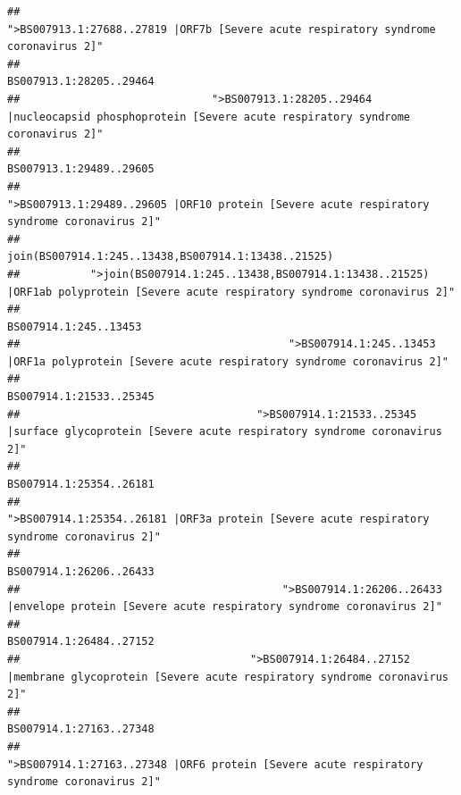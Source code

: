 \documentclass[
]{article}
\begin{document}
\begin{verbatim}
##                                                    ">BS007913.1:27688..27819 |ORF7b [Severe acute respiratory syndrome coronavirus 2]" 
##                                                                                                                BS007913.1:28205..29464 
##                              ">BS007913.1:28205..29464 |nucleocapsid phosphoprotein [Severe acute respiratory syndrome coronavirus 2]" 
##                                                                                                                BS007913.1:29489..29605 
##                                            ">BS007913.1:29489..29605 |ORF10 protein [Severe acute respiratory syndrome coronavirus 2]" 
##                                                                                    join(BS007914.1:245..13438,BS007914.1:13438..21525) 
##           ">join(BS007914.1:245..13438,BS007914.1:13438..21525) |ORF1ab polyprotein [Severe acute respiratory syndrome coronavirus 2]" 
##                                                                                                                  BS007914.1:245..13453 
##                                          ">BS007914.1:245..13453 |ORF1a polyprotein [Severe acute respiratory syndrome coronavirus 2]" 
##                                                                                                                BS007914.1:21533..25345 
##                                     ">BS007914.1:21533..25345 |surface glycoprotein [Severe acute respiratory syndrome coronavirus 2]" 
##                                                                                                                BS007914.1:25354..26181 
##                                            ">BS007914.1:25354..26181 |ORF3a protein [Severe acute respiratory syndrome coronavirus 2]" 
##                                                                                                                BS007914.1:26206..26433 
##                                         ">BS007914.1:26206..26433 |envelope protein [Severe acute respiratory syndrome coronavirus 2]" 
##                                                                                                                BS007914.1:26484..27152 
##                                    ">BS007914.1:26484..27152 |membrane glycoprotein [Severe acute respiratory syndrome coronavirus 2]" 
##                                                                                                                BS007914.1:27163..27348 
##                                             ">BS007914.1:27163..27348 |ORF6 protein [Severe acute respiratory syndrome coronavirus 2]" 

\end{verbatim}
\end{document}
